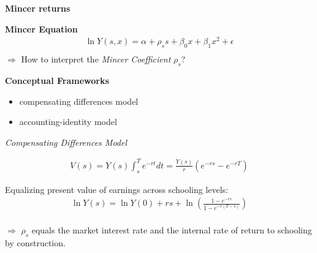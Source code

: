 \begin{frame}\begin{center}
\LARGE\textbf{Mincer returns}
\end{center}\end{frame}
\begin{frame}\nocite{Mincer.1958,Mincer.1974}
\textbf{Mincer Equation}\\
\begin{align*}
\ln{Y(s, x)} = \alpha + \rho_s s + \beta_0 x + \beta_1 x^2 + \epsilon\\
\end{align*}
$\Rightarrow$ How to interpret the \textit{Mincer Coefficient} $\rho_s$?
\end{frame}
\begin{frame}\textbf{Conceptual Frameworks}\vspace{0.3cm}
\begin{itemize}\setlength\itemsep{1em}
\item compensating differences model
\item accounting-identity model
\end{itemize}
\end{frame}
\begin{frame}\begin{center}
\LARGE\textit{Compensating Differences Model}
\end{center}\end{frame}

\begin{frame}
\begin{align*}
V(s) = Y(s)\int_s^T e^{-rt} dt = \frac{Y(s)}{r}(e^{-rs} - e^{-rT})
\end{align*}
\end{frame}

\begin{frame}

Equalizing present value of earnings across schooling levels:
\begin{align*}
\ln{Y(s)} = \ln{Y(0)} + r s + \ln{\left(\frac{1 -e^{-rs}}{1 - e^{-r(T - s)}}\right)} \\
\end{align*}

$\Rightarrow$ $\rho_s$ equals the market interest rate and the internal rate of return to schooling by construction.
\end{frame}

